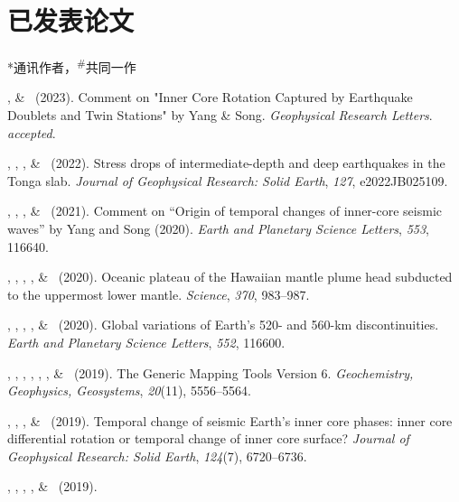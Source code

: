 \section{已发表论文}
\newcommand{\Revision}{\emph{正在审稿}}
\newcommand{\CS}{*} %
\newcommand{\CF}{\textsuperscript{\#}} %

\CS 通讯作者，\CF 共同一作
\begin{etaremune}
\item \Me\CS, \& \LWen\ (2023).
    Comment on "Inner Core Rotation Captured by Earthquake Doublets and Twin Stations" by Yang & Song.
    \emph{Geophysical Research Letters}.
    \emph{accepted}.
\item \Me\CS, \SWei\CS, \WWang, \& \FWang\ (2022).
    Stress drops of intermediate-depth and deep earthquakes in the Tonga slab.
    \emph{Journal of Geophysical Research: Solid Earth}, \emph{127}, e2022JB025109.
\item \JYao\CS, \Me, \LSun, \& \LWen\ (2021).
    Comment on ``Origin of temporal changes of inner-core seismic waves'' by Yang and Song (2020).
    \emph{Earth and Planetary Science Letters}, \emph{553}, 116640.
\item \SWei\CS, \PShearer, \CLithgowBertelloni, \LStixrude, \& \Me\ (2020).
    Oceanic plateau of the Hawaiian mantle plume head subducted to the uppermost lower mantle.
    \emph{Science}, \emph{370}, 983--987.
\item \Me\CS, \MLv, \SWei, \SDorfman, \& \PShearer\ (2020).
    Global variations of Earth's 520- and 560-km discontinuities.
    \emph{Earth and Planetary Science Letters}, \emph{552}, 116600. \\
\item
    \PWessel\CS, \JLuis, \LUieda, \RScharroo, \FWobbe, \WSmith, \& \Me\ (2019).
    The Generic Mapping Tools Version 6.
    \emph{Geochemistry, Geophysics, Geosystems}, \emph{20}(11), 5556--5564.
\item
    \JYao\CS, \Me, \LSun, \& \LWen\ (2019).
    Temporal change of seismic Earth's inner core phases: inner core differential rotation or temporal change of inner core surface?
    \emph{Journal of Geophysical Research: Solid Earth}, \emph{124}(7), 6720--6736.
\item
    \WFan\CS, \SWei, \Me, \JMcGurie, \& \DWiens\ (2019).

\end{etaremune}
